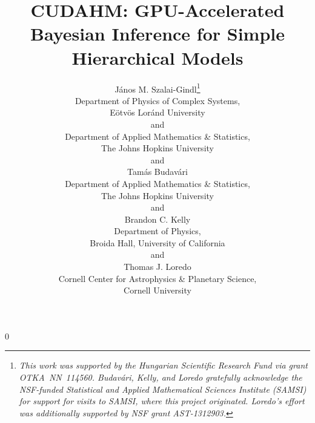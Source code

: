 \documentclass[12pt]{article}
\newcommand{\blind}{0}
\numberwithin{equation}{section}
\numberwithin{figure}{section}
\numberwithin{table}{section}
\begin{document}
\def\spacingset#1{\renewcommand{\baselinestretch}%
{#1}\small\normalsize} \spacingset{1}

\blind
{
  \title{\bf CUDAHM:  GPU-Accelerated Bayesian Inference for Simple Hierarchical Models}
  \author{J\'anos M. Szalai-Gindl\thanks{
    \textit{This work was supported by the Hungarian Scientific Research Fund via grant OTKA~NN~114560.  Budav\'ari, Kelly, and Loredo gratefully acknowledge the NSF-funded Statistical and Applied Mathematical Sciences Institute (SAMSI) for support for visits to SAMSI, where this project originated. Loredo's effort was additionally supported by NSF grant AST-1312903.}}\hspace{.2cm}\\
    Department of Physics of Complex Systems,\\
    E\"otv\"os Lor\'and University\\
	and\\	
	Department of Applied Mathematics \& Statistics,\\    
    The Johns Hopkins University\\
    and \\
    Tam\'as Budav\'ari \\
    Department of Applied Mathematics \& Statistics,\\
    The Johns Hopkins University\\
    and \\
    Brandon C. Kelly \\
    Department of Physics,\\
    Broida Hall, University of California\\
    and \\
    Thomas J. Loredo \\
    Cornell Center for Astrophysics \& Planetary Science,\\
    Cornell University \\%
}
    
  \maketitle
} \fi
\end{document}
